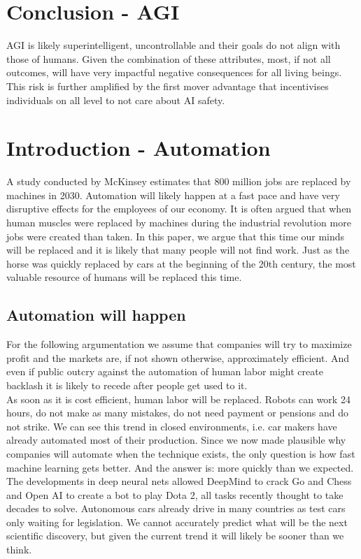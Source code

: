 \documentclass[conference]{IEEEtran}
\begin{document}
\section{Conclusion - AGI}

AGI is likely superintelligent, uncontrollable and their goals do not align with those of humans. Given the combination of these attributes, most, if not all outcomes, will have very impactful negative consequences for all living beings. This risk is further amplified by the first mover advantage that incentivises individuals on all level to not care about AI safety.

\section{Introduction - Automation}
%
A study conducted by McKinsey \cite{AutomationMcKinsey} estimates that 800 million jobs are replaced by machines in 2030. Automation will likely happen at a fast pace and have very disruptive effects for the employees of our economy. It is often argued that when human muscles were replaced by machines during the industrial revolution more jobs were created than taken. In this paper, we argue that this time our minds will be replaced and it is likely that many people will not find work. Just as the horse was quickly replaced by cars at the beginning of the 20th century, the most valuable resource of humans will be replaced this time. 

\subsection{Automation will happen}

For the following argumentation we assume that companies will try to maximize profit and the markets are, if not shown otherwise, approximately efficient. And even if public outcry against the automation of human labor might create backlash it is likely to recede after people get used to it.\\
As soon as it is cost efficient, human labor will be replaced. Robots can work 24 hours, do not make as many mistakes, do not need payment or pensions and do not strike. We can see this trend in closed environments, i.e. car makers have already automated most of their production. Since we now made plausible why companies will automate when the technique exists, the only question is how fast machine learning gets better. And the answer is: more quickly than we expected. The developments in deep neural nets allowed DeepMind to crack Go and Chess and Open AI to create a bot to play Dota 2, all tasks recently thought to take decades to solve. Autonomous cars already drive in many countries as test cars only waiting for legislation. We cannot accurately predict what will be the next scientific discovery, but given the current trend it will likely be sooner than we think. 
\end{document}
